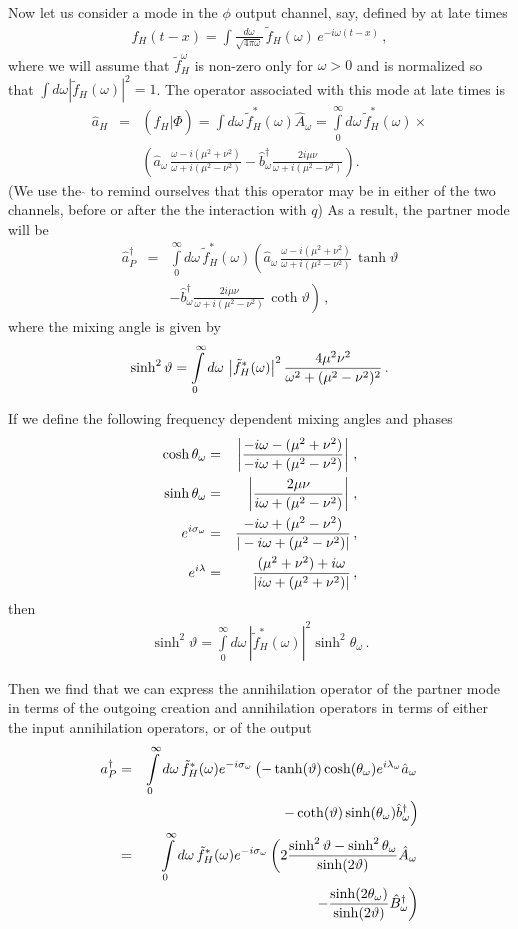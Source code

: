 \documentclass[aps,prd,showpacs,amssymb,nofootinbib,twocolumn]{revtex4}
\newcommand{\inner}[2]{\left(#1|#2\right)}
\newcommand{\nn}{\nonumber\\}
\newcommand{\bea}{\begin{eqnarray}}
\newcommand{\eea}{\end{eqnarray}}
\begin{document}
Now let us consider a mode in the $\phi$ output channel, say, defined by at
late times 
%
\bea
f_H(t-x)
= 
\int\frac{d\omega}{\sqrt{4\pi\omega}}\,
\tilde f_H(\omega)\,e^{-i\omega (t-x)}
\,,
\eea
%
where we will assume that $\tilde f_H^\omega$ is non-zero only for 
$\omega>0$  and is normalized so that 
$\int d\omega|\tilde f_H(\omega)|^2=1$. 
%
The operator associated with this mode at late times is 
%
\bea
\hat a_H
&=&
\inner{f_H}{\hat\Phi}
=
\int d\omega\,\tilde f_H^*(\omega)\hat A_\omega
=
\int\limits_0^\infty d\omega\,\tilde f_H^*(\omega) 
\times
\nn
&&
\left(
\hat a_\omega\,\frac{\omega-i(\mu^2+\nu^2)}{\omega+i(\mu^2-\nu^2)}
- 
\hat b^\dagger_\omega 
\frac{2i\mu\nu}{\omega+i(\mu^2-\nu^2)}
\right).  
\eea
%
(We use the $\hat{}$ to remind ourselves that this operator may be in either
of the two channels, before or after the the interaction with $q$)
As a result, the partner mode will be
%
\bea
\hat a_P^\dagger 
&=&
\int\limits_0^\infty d\omega\,\tilde f_H^*(\omega) 
\left( 
\hat a_\omega\,
\frac{\omega-i(\mu^2+\nu^2)}{\omega+i(\mu^2-\nu^2)}\,
\tanh\vartheta
\right. 
\nn
&&
\left.
-
\hat b^\dagger_\omega
\frac{2i\mu\nu}{\omega+i(\mu^2-\nu^2)}\,\coth\vartheta
\right) 
\,,
\eea
%
where the mixing angle is given by 
%
\bea
\sinh^2\vartheta= 
\int\limits_0^\infty d\omega\,\left|\tilde f_H^*(\omega)\right|^2
{4\mu^2\nu^2\over \omega^2+(\mu^2-\nu^2)^2} 
\,.
\eea

If we define the following frequency dependent mixing angles and phases 
%
\bea
\cosh\theta_\omega&=& \left\vert {-i\omega-(\mu^2+\nu^2)
\over -i\omega+(\mu^2-\nu^2)}\right\vert
\,,
\\
\sinh\theta_\omega&=& \left\vert {2\mu\nu\over
i\omega+(\mu^2-\nu^2)}\right\vert
\,,
\\
e^{i\sigma_\omega}&=& {-i\omega+(\mu^2-\nu^2)\over |-i\omega+(\mu^2-\nu^2)|}
\,,
\\
e^{i\lambda}&=& {(\mu^2+\nu^2)+i\omega 
\over|i\omega+(\mu^2+\nu^2)|}
\,,
\eea
%
then 
%
\bea
\sinh^2\vartheta = 
\int\limits_0^\infty d\omega\,\left|\tilde f_H^*(\omega)\right|^2
\sinh^2\theta_\omega
\,.
\eea
%

Then we find that we can express the annihilation operator of the partner mode
in terms of the outgoing creation and annihilation operators in terms of
either the input annihilation operators, or of the output
\bea
a_P^\dagger&=& 
\int\limits_0^\infty d\omega\,\tilde f_H^*(\omega) 
e^{-i\sigma_\omega} 
\left (- \tanh(\vartheta)
\cosh(\theta_\omega) e^{i\lambda_\omega} \hat a_\omega 
\right.
\nn
&&
\left.
- \coth(\vartheta)
\sinh(\theta_\omega) \hat b_\omega^\dagger\right)\\
&=& 
\int\limits_0^\infty d\omega\,\tilde f_H^*(\omega) 
e^{-i\sigma_\omega} \left(2{ \sinh^2\vartheta-\sinh^2\theta_\omega\over
\sinh(2\vartheta) } \hat A_\omega 
\right.
\nn
&&
\left.
- {\sinh(2\theta_\omega)\over
\sinh(2\vartheta)} \hat B_\omega^\dagger\right)
\eea
\end{document}
